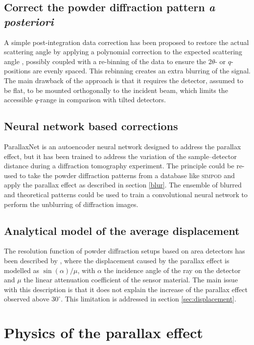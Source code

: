 \documentclass[preprint,pdf]{iucr}              %
\begin{document}
     \subsection{Correct the powder diffraction pattern \textit{a posteriori}}
A simple post-integration data correction has been proposed to restore the actual
scattering angle by applying a polynomial correction to the expected scattering angle
\cite{parallax_polynomial}, possibly coupled with a re-binning of the data to ensure the
$2\theta$- or $q$-positions are evenly spaced.
This rebinning creates an extra blurring of the signal.
The main drawback of the approach is that it requires the detector, assumed to be flat,
to be mounted orthogonally to the incident beam, which limits the accessible $q$-range in comparison with tilted detectors.

     \subsection{Neural network based corrections}
ParallaxNet \cite{ParallaxNet} is an autoencoder neural network designed to address the parallax effect, but it has been trained to address the variation of the sample--detector distance
during a diffraction tomography experiment. 
The principle could be re-used to take the powder diffraction patterns from a
database like \textsc{simpod} \cite{simpod} and apply the parallax effect as described
in section \ref{blur}.
The ensemble of blurred and theoretical patterns could be used to train a convolutional
neural network to perform the unblurring of diffraction images.

     \subsection{Analytical model of the average displacement}
     \label{sec:analytical-model}
The resolution function of powder diffraction setups based on area detectors has been
described by , where the displacement caused by the
parallax effect is modelled as $\sin(\alpha)/\mu$, with $\alpha$ the incidence angle of
the ray on the detector and $\mu$ the linear attenuation coefficient of the sensor
material.
The main issue with this description is that it does not explain the increase of the
parallax effect observed above $30^\circ$.
This limitation is addressed in section \ref{sec:displacement}.

\section{Physics of the parallax effect}
\end{document}
